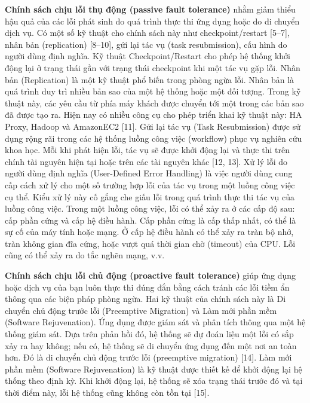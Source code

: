 \documentclass[
  vietnamese,
]{article}
\begin{document}
\textbf{Chính sách chịu lỗi thụ động (passive fault tolerance)} nhằm
giảm thiểu hậu quả của các lỗi phát sinh do quá trình thực thi ứng dụng
hoặc do di chuyển dịch vụ. Có một số kỹ thuật cho chính sách này như
checkpoint/restart {[}5--7{]}, nhân bản (replication) {[}8--10{]}, gửi
lại tác vụ (task resubmission), cấu hình do người dùng định nghĩa. Kỹ
thuật Checkpoint/Restart cho phép hệ thống khởi động lại ở trạng thái
gần với trạng thái checkpoint khi một tác vụ gặp lỗi. Nhân bản
(Replication) là một kỹ thuật phổ biến trong phòng ngừa lỗi. Nhân bản là
quá trình duy trì nhiều bản sao của một hệ thống hoặc một đối tượng.
Trong kỹ thuật này, các yêu cầu từ phía máy khách được chuyển tới một
trong các bản sao đã được tạo ra. Hiện nay có nhiều công cụ cho phép
triển khai kỹ thuật này: HA Proxy, Hadoop và AmazonEC2 {[}11{]}. Gửi lại
tác vụ (Task Resubmission) được sử dụng rộng rãi trong các hệ thống
luồng công việc (workflow) phục vụ nghiên cứu khoa học. Mỗi khi phát
hiện lỗi, tác vụ sẽ được khởi động lại và thực thi trên chính tài nguyên
hiện tại hoặc trên các tài nguyên khác {[}12, 13{]}. Xử lý lỗi do người
dùng định nghĩa (User-Defined Error Handling) là việc người dùng cung
cấp cách xử lý cho một số trường hợp lỗi của tác vụ trong một luồng công
việc cụ thể. Kiểu xử lý này cố gắng che giấu lỗi trong quá trình thực
thi tác vụ của luồng công việc. Trong một luồng công việc, lỗi có thể
xảy ra ở các cấp độ sau: cấp phần cứng và cấp hệ điều hành. Cấp phần
cứng là cấp thấp nhất, có thể là sự cố của máy tính hoặc mạng. Ở cấp hệ
điều hành có thể xảy ra tràn bộ nhớ, tràn không gian đĩa cứng, hoặc vượt
quá thời gian chờ (timeout) của CPU. Lỗi cũng có thể xảy ra do tắc nghẽn
mạng, v.v.

\textbf{Chính sách chịu lỗi chủ động (proactive fault tolerance)} giúp
ứng dụng hoặc dịch vụ của bạn luôn thực thi đúng đắn bằng cách tránh các
lỗi tiềm ẩn thông qua các biện pháp phòng ngừa. Hai kỹ thuật của chính
sách này là Di chuyển chủ động trước lỗi (Preemptive Migration) và Làm
mới phần mềm (Software Rejuvenation). Ứng dụng được giám sát và phân
tích thông qua một hệ thống giám sát. Dựa trên phản hồi đó, hệ thống sẽ
dự đoán liệu một lỗi có sắp xảy ra hay không; nếu có, hệ thống sẽ di
chuyển ứng dụng đến một nơi an toàn hơn. Đó là di chuyển chủ động trước lỗi (preemptive migration) {[}14{]}. Làm mới phần mềm
(Software Rejuvenation) là kỹ thuật được thiết kế để khởi động lại hệ
thống theo định kỳ. Khi khởi động lại, hệ thống sẽ xóa trạng thái trước
đó và tại thời điểm này, lỗi hệ thống cũng không còn tồn tại {[}15{]}.
\end{document}
